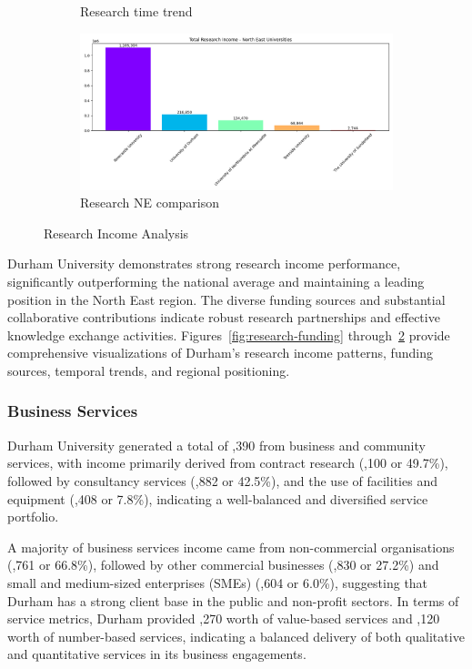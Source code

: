 \documentclass[journal,onecolumn, 10pt,draftclsnofoot]{IEEEtran}
\begin{document}
\begin{figure}[h]
\begin{subfigure}[b]{0.48\textwidth}
    \caption{Research time trend}
    \label{fig:research-time-trend}
\end{subfigure}
\hfill
\begin{subfigure}[b]{0.48\textwidth}
    \centering
    \includegraphics[width=\textwidth]{Fig/figure6.research_ne_comparison.png}
    \caption{Research NE comparison}
    \label{fig:research-ne-comparison}
\end{subfigure}
\caption{Research Income Analysis}
\label{fig:research-income-analysis}
\end{figure}

Durham University demonstrates strong research income performance, significantly outperforming the national average and maintaining a leading position in the North East region. The diverse funding sources and substantial collaborative contributions indicate robust research partnerships and effective knowledge exchange activities. Figures~\ref{fig:research-funding} through~\ref{fig:research-ne-comparison} provide comprehensive visualizations of Durham's research income patterns, funding sources, temporal trends, and regional positioning.

\subsubsection{Business Services}

Durham University generated a total of ,390 from business and community services, with income primarily derived from contract research (,100 or 49.7\%), followed by consultancy services (,882 or 42.5\%), and the use of facilities and equipment (,408 or 7.8\%), indicating a well-balanced and diversified service portfolio.

A majority of business services income came from non-commercial organisations (,761 or 66.8\%), followed by other commercial businesses (,830 or 27.2\%) and small and medium-sized enterprises (SMEs) (,604 or 6.0\%), suggesting that Durham has a strong client base in the public and non-profit sectors. In terms of service metrics, Durham provided ,270 worth of value-based services and ,120 worth of number-based services, indicating a balanced delivery of both qualitative and quantitative services in its business engagements.
\end{document}

